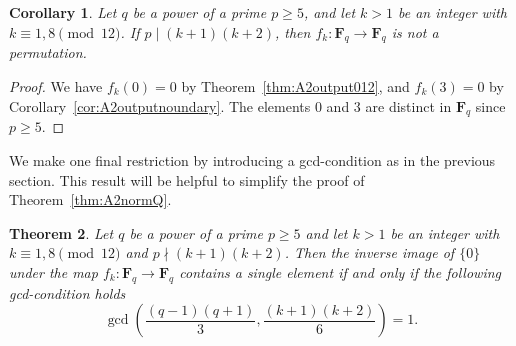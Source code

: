 \documentclass{amsart}
\newcommand{\F}{\mathbf F}
\numberwithin{equation}{section}
\theoremstyle{plain}
\newtheorem{theorem}{Theorem}
\newtheorem{corollary}[theorem]{Corollary}
\theoremstyle{definition}
\begin{document}
\begin{corollary}\label{cor:notperm}
Let $q$ be a power of a prime $p\ge 5$, and let $k>1$ be an integer with $k\equiv1,8\pmod{12}$. If $p\mid (k+1)(k+2)$, then $f_k:\F_q\rightarrow\F_q$ is not a permutation. 
\end{corollary}
\begin{proof}
We have $f_k(0)=0$ by Theorem~\ref{thm:A2output012}, and $f_k(3)= 0$ by Corollary~\ref{cor:A2outputnoundary}. The elements $0$ and $3$ are distinct in $\F_q$ since  $p\ge 5$. 
\end{proof}

We make one final restriction by introducing a gcd-condition as in the previous section. This result will be helpful to simplify the proof of Theorem~\ref{thm:A2normQ}. 

\begin{theorem}\label{thm:notperm}
Let $q$ be a power of a prime $p \ge 5$ and let $k>1$ be an integer with $k\equiv1,8\pmod{12}$ and $p\nmid(k+1)(k+2)$. Then the inverse image of $\{0\}$ under the map $f_{k}:\F_{q}\to\F_{q}$ contains a single element if and only if the following gcd-condition holds
	$$
	\gcd\left(\frac{(q-1)(q+1)}{3}, \frac{(k+1)(k+2)}{6}\right)=1.
	$$
\end{theorem}
\end{document}
